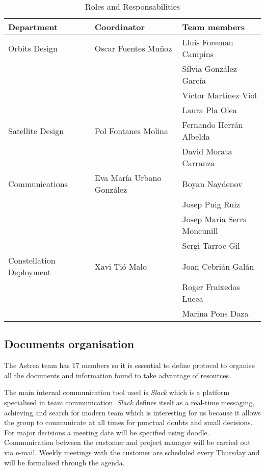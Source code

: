 \begin{table}[h]
\begin{tabular}{ | l | l | p{5cm} |}
\hline
\textbf{Department} & \textbf{Coordinator} & \textbf{Team members} \\ \hline
Orbits Design & Oscar Fuentes Muñoz & Llu\'{i}s Foreman Campins\\ \hline
 & & S\'{i}lvia Gonz\'{a}lez Garc\'{i}a \\ \hline
 & & V\'{i}ctor Mart\'{i}nez Viol \\ \hline
 & & Laura Pla Olea \\ \hline
Satellite Design & Pol Fontanes Molina & Fernando Herr\'{a}n Albelda \\ \hline
 & & David Morata Carranza \\ \hline
Communications & Eva Mar\'{i}a Urbano Gonz\'{a}lez & Boyan Naydenov \\ \hline
 & & Josep Puig Ruiz \\ \hline
 & & Josep Mar\'{i}a Serra Moncunill \\ \hline
 & & Sergi Tarroc Gil \\ \hline
Constellation Deployment & Xavi Ti\'{o} Malo & Joan Cebri\'{a}n Gal\'{a}n \\ \hline
 & & Roger Fraixedas Lucea \\ \hline
 & & Marina Pons Daza \\ \hline

\end{tabular}
\caption{Roles and Responsabilities}
\end{table}
\subsection{Documents organisation}


The Astrea team has 17 members so it is essential to define protocol to organise all the documents and information found to take advantage of resources. 
\newline

The main internal communication tool used is \textit{Slack} which is a platform specialised in team communication. \textit{Slack} defines itself as a real-time messaging, achieving and search for modern team which is interesting for us because it allows the group to communicate at all times for punctual doubts and small decisions. For major decisions a meeting date will be specified using doodle. Communication between the customer and project manager will be carried out via e-mail. Weekly meetings with the customer are scheduled every Thursday and will be formalised through the agenda.
\newline

